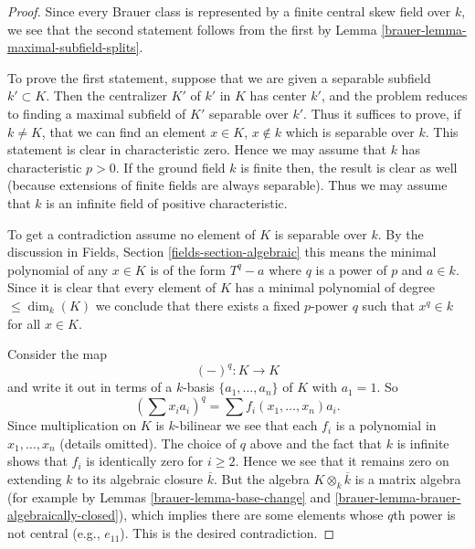 \begin{proof}

Since every Brauer class is represented by a finite central skew
field over $k$, we see that the second statement follows from the
first by
Lemma \ref{brauer-lemma-maximal-subfield-splits}.

\medskip\noindent
To prove the first statement, suppose that we are given a separable
subfield $k' \subset K$. Then the centralizer $K'$ of $k'$ in $K$
has center $k'$, and the problem reduces to finding a maximal
subfield of $K'$ separable over $k'$. Thus it suffices to prove, if
$k \not = K$, that we can find an element $x \in K$, $x \not \in k$
which is separable over $k$. This statement is clear in characteristic
zero. Hence we may assume that $k$ has characteristic $p > 0$. If the
ground field $k$ is finite then, the result is clear as well (because
extensions of finite fields are always separable). Thus we may assume
that $k$ is an infinite field of positive characteristic.

\medskip\noindent
To get a contradiction assume no element of $K$ is separable over $k$.
By the discussion in
Fields, Section \ref{fields-section-algebraic}
this means the minimal polynomial of any $x \in K$ is of the form
$T^q - a$ where $q$ is a power of $p$ and $a \in k$. Since it is
clear that every element of $K$ has a minimal polynomial of degree
$\leq \dim_k(K)$ we conclude that there exists a fixed $p$-power
$q$ such that $x^q \in k$ for all $x \in K$.

\medskip\noindent
Consider the map
$$
(-)^q : K \longrightarrow K
$$
and write it out in terms of a $k$-basis $\{a_1, \ldots, a_n\}$ of $K$
with $a_1 = 1$. So
$$
(\sum x_i a_i)^q = \sum f_i(x_1, \ldots, x_n)a_i.
$$
Since multiplication on $K$ is $k$-bilinear we see that each $f_i$
is a polynomial in $x_1, \ldots, x_n$ (details omitted).
The choice of $q$ above and the fact that $k$ is infinite shows that
$f_i$ is identically zero for $i \geq 2$. Hence we see that it remains
zero on extending $k$ to its algebraic closure $\overline{k}$. But the
algebra $K \otimes_k \overline{k}$ is a matrix algebra (for example by
Lemmas \ref{brauer-lemma-base-change} and \ref{brauer-lemma-brauer-algebraically-closed}),
which implies there are some elements whose $q$th power is not central
(e.g., $e_{11}$). This is the desired contradiction.
\end{proof}

